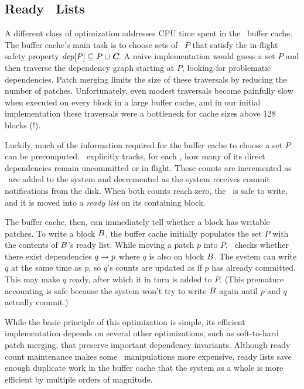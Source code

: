 
\subsection{Ready \Patch\ Lists}
\label{sec:patch:readylist}
\label{readylist}

\newcommand{\PReady}[1]{\ensuremath{#1.\textit{ready}}}

A different class of optimization addresses CPU time spent in the
\Kudos\ buffer cache.
%
The buffer cache's main task is to choose sets of \patches\ $P$ that
satisfy the in-flight safety property $\PDepset{P} \subseteq P \cup
\PDisk$.
%
A naive implementation would guess a set $P$ and then traverse the dependency graph starting
at $P$, looking for problematic dependencies.
%
Patch merging limits the size of these traversals by reducing the number of
patches.
%
Unfortunately, even modest traversals become painfully slow when executed
on every block in a large buffer cache, and in our initial implementation
these traversals were a bottleneck for cache
sizes above 128 blocks (!).
 
Luckily, much of the information
required for the buffer cache to choose a set $P$ can be precomputed.
%
\Kudos\ explicitly tracks, for each \patch, how many of its
direct dependencies remain uncommitted or in flight.
%
These counts are incremented as \patches\ are added to the system and
decremented as the system receives commit notifications from the disk.
%
When both counts reach zero, the \patch\ is safe to write, and it is moved
into a \emph{ready list} on its containing block.
%
\begin{comment}
(\Noop\ \patches\ automatically commit when all their dependencies commit.)
\end{comment}
%
The buffer cache, then, can immediately tell whether a block has writable
patches.
%
To write a block $B$, the buffer cache initially populates the set $P$ with the
contents of $B$'s ready list.
%
While moving a patch $p$ into $P$, \Kudos\ checks whether there exist
dependencies $q \rightarrow p$ where $q$ is also on block $B$.
%
The system can write $q$ at the same time as $p$, so $q$'s
counts are updated as if $p$ has already committed.
%
This may make $q$ ready, after which it in turn is added to $P$.
%
(This premature accounting is safe because the system won't try to write
$B$ again until $p$ and $q$ actually commit.)


While the basic principle of this optimization is simple, its efficient
implementation depends on several other optimizations, such as soft-to-hard
patch merging, that preserve important dependency invariants.
%
Although ready count maintenance makes some
\patch\ manipulations more expensive, ready lists save enough duplicate work in
the buffer cache that the system as a whole is more efficient by multiple orders of
magnitude.


